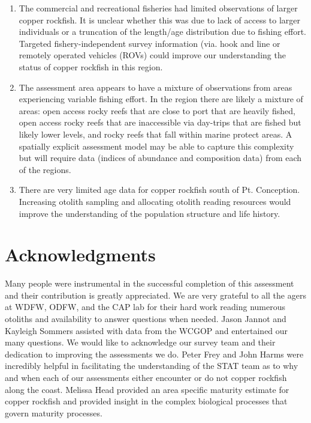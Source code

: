 \documentclass[11pt,
  english,
  a4paper,
]{article}
\begin{document}
\begin{enumerate}

    \item The commercial and recreational fisheries had limited observations of larger copper rockfish.  It is unclear whether this was due to lack of access to larger individuals or a truncation of the length/age distribution due to fishing effort. Targeted fishery-independent survey information (via. hook and line or remotely operated vehicles (ROVs) could improve our understanding the status of copper rockfish in this region.

    \item The assessment area appears to have a mixture of observations from areas experiencing variable fishing effort.  In the region there are likely a mixture of areas: open access rocky reefs that are close to port that are heavily fished, open access rocky reefs that are inaccessible via day-trips that are fished but likely lower levels, and rocky reefs that fall within marine protect areas.  A spatially explicit assessment model may be able to capture this complexity but will require data (indices of abundance and composition data) from each of the regions. 

    \item There are very limited age data for copper rockfish south of Pt. Conception. Increasing otolith sampling and allocating otolith reading resources would improve the understanding of the population structure and life history. 

\end{enumerate}


\hypertarget{acknowledgments}{%
\section{Acknowledgments}\label{acknowledgments}}

\leavevmode\tagmcend\tagstructend


Many people were instrumental in the successful completion of this assessment and their contribution is greatly appreciated. We are very grateful to all the agers at WDFW, ODFW, and the CAP lab for their hard work reading numerous otoliths and availability to answer questions when needed. Jason Jannot and Kayleigh Sommers assisted with data from the WCGOP and entertained our many questions. We would like to acknowledge our survey team and their dedication to improving the assessments we do. Peter Frey and John Harms were incredibly helpful in facilitating the understanding of the STAT team as to why and when each of our assessments either encounter or do not copper rockfish along the coast. Melissa Head provided an area specific maturity estimate for copper rockfish and provided insight in the complex biological processes that govern maturity processes.
\end{document}
